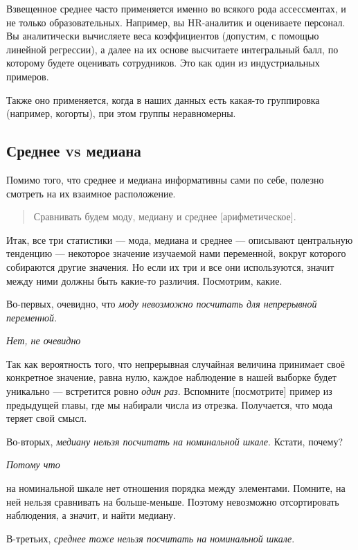 \documentclass[
  letterpaper,
  DIV=11,
  numbers=noendperiod]{scrreprt}
\theoremstyle{definition}
\theoremstyle{remark}
\begin{document}
Взвещенное среднее часто применяется именно во всякого рода
ассессментах, и не только образовательных. Например, вы HR-аналитик и
оцениваете персонал. Вы аналитически вычисляете веса коэффициентов
(допустим, с помощью линейной регрессии), а далее на их основе
высчитаете интегральный балл, по которому будете оценивать сотрудников.
Это как один из индустриальных примеров.

Также оно применяется, когда в наших данных есть какая-то группировка
(например, когорты), при этом группы неравномерны.

\subsection{Среднее vs медиана}\label{andan-descriptives-mean-vs-median}

Помимо того, что среднее и медиана информативны сами по себе, полезно
смотреть на их взаимное расположение.

\begin{quote}
Сравнивать будем моду, медиану и среднее {[}арифметическое{]}.
\end{quote}

Итак, все три статистики --- мода, медиана и среднее --- описывают
центральную тенденцию --- некоторое значение изучаемой нами переменной,
вокруг которого собираются другие значения. Но если их три и все они
используются, значит между ними должны быть какие-то различия.
Посмотрим, какие.

Во-первых, очевидно, что \emph{моду невозможно посчитать для непрерывной
переменной}.

\emph{Нет, не очевидно}

Так как вероятность того, что непрерывная случайная величина принимает
своё конкретное значение, равна нулю, каждое наблюдение в нашей выборке
будет уникально --- встретится ровно \emph{один раз}. Вспомните
{[}посмотрите{]} пример из предыдущей главы, где мы набирали числа из
отрезка. Получается, что мода теряет свой смысл.

Во-вторых, \emph{медиану нельзя посчитать на номинальной шкале}. Кстати,
почему?

\emph{Потому что}

на номинальной шкале нет отношения порядка между элементами. Помните, на
ней нельзя сравнивать на больше-меньше. Поэтому невозможно отсортировать
наблюдения, а значит, и найти медиану.

В-третьих, \emph{среднее тоже нельзя посчитать на номинальной шкале}.
\end{document}
